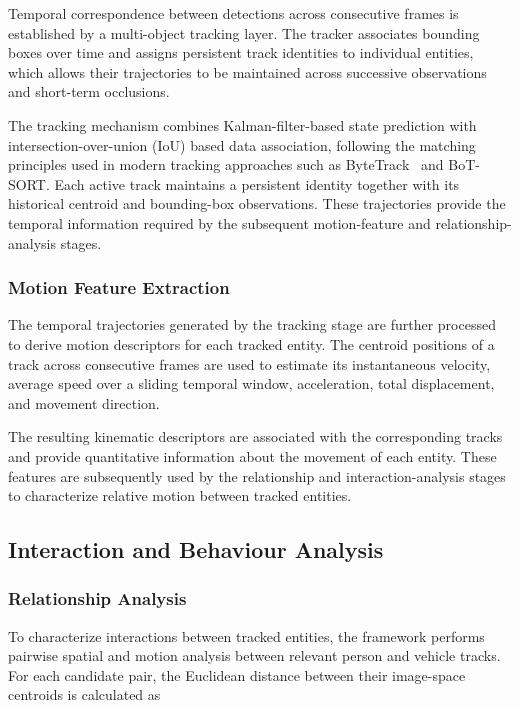 \documentclass[runningheads]{llncs}
\begin{document}
Temporal correspondence between detections across consecutive
frames is established by a multi-object tracking layer. The tracker
associates bounding boxes over time and assigns persistent track identities
to individual entities, which allows their trajectories to be maintained across
successive observations and short-term occlusions.

The tracking mechanism combines Kalman-filter-based state prediction with
intersection-over-union (IoU) based data association, following the matching
principles used in modern tracking approaches such as ByteTrack~\cite{bytetrack} and
BoT-SORT. Each active track maintains a persistent identity together with
its historical centroid and bounding-box observations. These trajectories
provide the temporal information required by the subsequent motion-feature
and relationship-analysis stages.

\subsubsection{Motion Feature Extraction}

The temporal trajectories generated by the tracking stage are further
processed to derive motion descriptors for each tracked entity. The
centroid positions of a track across consecutive frames are used to
estimate its instantaneous velocity, average speed over a sliding temporal
window, acceleration, total displacement, and movement direction.

The resulting kinematic descriptors are associated with the corresponding
tracks and provide quantitative information about the movement of each
entity. These features are subsequently used by the relationship and
interaction-analysis stages to characterize relative motion between
tracked entities.

\subsection{Interaction and Behaviour Analysis}

\subsubsection{Relationship Analysis}

To characterize interactions between tracked entities, the framework
performs pairwise spatial and motion analysis between relevant person and
vehicle tracks. For each candidate pair, the Euclidean distance between
their image-space centroids is calculated as
\end{document}
